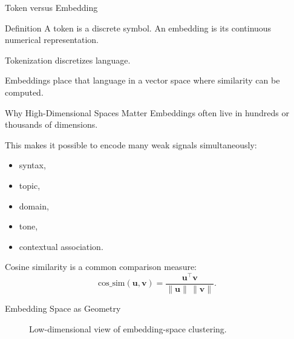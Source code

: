 \documentclass[12pt]{beamer}
\begin{document}
\begin{frame}{Token versus Embedding}
  \begin{conceptbox}{Definition}
    A token is a discrete symbol. An embedding is its continuous numerical representation.
  \end{conceptbox}

  Tokenization discretizes language.

  Embeddings place that language in a vector space where similarity can be computed.
\end{frame}

\begin{frame}{Why High-Dimensional Spaces Matter}
  Embeddings often live in hundreds or thousands of dimensions.

  This makes it possible to encode many weak signals simultaneously:
  \begin{itemize}
    \item syntax,
    \item topic,
    \item domain,
    \item tone,
    \item contextual association.
  \end{itemize}

  Cosine similarity is a common comparison measure:
  \[
    \mathrm{cos\_sim}(\mathbf{u},\mathbf{v}) = \frac{\mathbf{u}^\top\mathbf{v}}{\|\mathbf{u}\|\,\|\mathbf{v}\|}.
  \]
\end{frame}

\begin{frame}{Embedding Space as Geometry}
  \begin{figure}
    \centering
    \caption{Low-dimensional view of embedding-space clustering.}
  \end{figure}
\end{frame}
\end{document}
